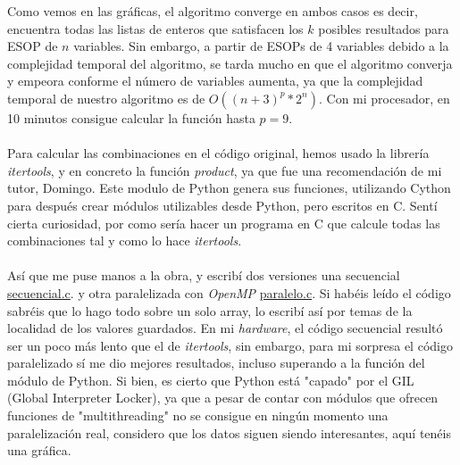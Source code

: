 \noindent Como vemos en las gráficas, el algoritmo converge en ambos casos es decir, encuentra todas las listas de enteros que satisfacen los $k$ posibles resultados para ESOP de $n$ variables. Sin embargo, a partir de ESOPs de 4 variables debido a la complejidad temporal del algoritmo, se tarda mucho en que el algoritmo converja y empeora conforme el número de variables aumenta, ya que la complejidad temporal de nuestro algoritmo es de $O((n+3)^p * 2^n)$. Con mi procesador, en 10 minutos consigue calcular la función hasta $p = 9$.
\\\\
Para calcular las combinaciones en el código original, hemos usado la librería \textit{itertools}, y en concreto la función \textit{product}, ya que fue una recomendación de mi tutor, Domingo. Este modulo de Python genera sus funciones, utilizando Cython para después crear módulos utilizables desde Python, pero escritos en C. Sentí cierta curiosidad, por como sería hacer un programa en C que calcule todas las combinaciones tal y como lo hace \textit{itertools}.\\\\
Así que me puse manos a la obra, y escribí dos versiones una secuencial \href{https://github.com/domingoUnican/TFGPedroCastro/blob/main/code/list_product/list_product.c}{secuencial.c}. y otra paralelizada con \textit{OpenMP} \href{https://github.com/domingoUnican/TFGPedroCastro/blob/main/code/list_product/list_product_parallel.c}{paralelo.c}. Si habéis leído el código sabréis que lo hago todo sobre un solo array, lo escribí así por temas de la localidad de los valores guardados. En mi \textit{hardware}, el código secuencial resultó ser un poco más lento que el de \textit{itertools}, sin embargo, para mi sorpresa el código paralelizado sí me dio mejores resultados, incluso superando a la función del módulo de Python. Si bien, es cierto que Python está "capado" por el GIL (Global Interpreter Locker), ya que a pesar de contar con módulos que ofrecen funciones de "multithreading" no se consigue en ningún momento una paralelización real, considero que los datos siguen siendo interesantes, aquí tenéis una gráfica.

